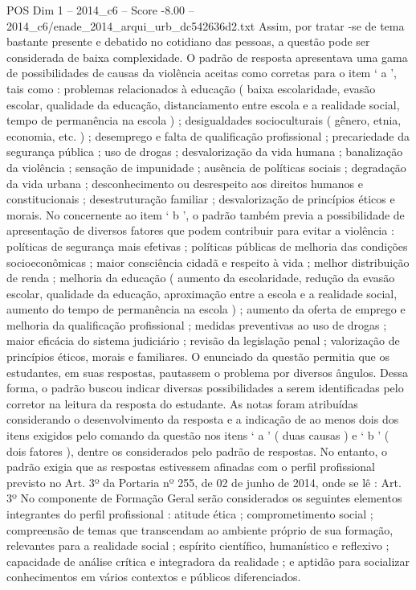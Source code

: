 \begin{textsample}{POS Dim 1 – 2014\_c6 – Score -8.00 – 2014\_c6/enade\_2014\_arqui\_urb\_dc542636d2.txt}
Assim, por tratar -se de tema bastante presente e debatido no cotidiano das pessoas, a questão pode ser considerada de baixa complexidade.
O padrão de resposta apresentava uma gama de possibilidades de causas da violência aceitas como corretas para o item ‘ a ’, tais como : problemas relacionados à educação ( baixa escolaridade, evasão escolar, qualidade da educação, distanciamento entre escola e a realidade social, tempo de permanência na escola ) ; desigualdades socioculturais ( gênero, etnia, economia, etc. ) ; desemprego e falta de qualificação profissional ; precariedade da segurança pública ; uso de drogas ; desvalorização da vida humana ; banalização da violência ; sensação de impunidade ; ausência de políticas sociais ; degradação da vida urbana ; desconhecimento ou desrespeito aos direitos humanos e constitucionais ; desestruturação familiar ; desvalorização de princípios éticos e morais.
No concernente ao item ‘ b ’, o padrão também previa a possibilidade de apresentação de diversos fatores que podem contribuir para evitar a violência : políticas de segurança mais efetivas ; políticas públicas de melhoria das condições socioeconômicas ; maior consciência cidadã e respeito à vida ; melhor distribuição de renda ; melhoria da educação ( aumento da escolaridade, redução da evasão escolar, qualidade da educação, aproximação entre a escola e a realidade social, aumento do tempo de permanência na escola ) ; aumento da oferta de emprego e melhoria da qualificação profissional ; medidas preventivas ao uso de drogas ; maior eficácia do sistema judiciário ; revisão da legislação penal ; valorização de princípios éticos, morais e familiares.
O enunciado da questão permitia que os estudantes, em suas respostas, pautassem o problema por diversos ângulos.
Dessa forma, o padrão buscou indicar diversas possibilidades a serem identificadas pelo corretor na leitura da resposta do estudante.
As notas foram atribuídas considerando o desenvolvimento da resposta e a indicação de ao menos dois dos itens exigidos pelo comando da questão nos itens ‘ a ’ ( duas causas ) e ‘ b ’ ( dois fatores ), dentre os considerados pelo padrão de respostas.
No entanto, o padrão exigia que as respostas estivessem afinadas com o perfil profissional previsto no Art. 3º da Portaria nº 255, de 02 de junho de 2014, onde se lê : Art. 3º No componente de Formação Geral serão considerados os seguintes elementos integrantes do perfil profissional : atitude ética ; comprometimento social ; compreensão de temas que transcendam ao ambiente próprio de sua formação, relevantes para a realidade social ; espírito científico, humanístico e reflexivo ; capacidade de análise crítica e integradora da realidade ; e aptidão para socializar conhecimentos em vários contextos e públicos diferenciados.

\end{textsample}
